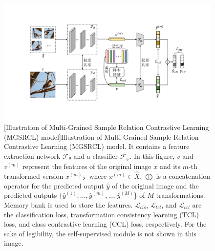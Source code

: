 \begin{figure}[h!]
\centering
{}
\includegraphics[width=1.0\columnwidth]{figures/MGSRCL/model.pdf}
[Illustration of Multi-Grained Sample Relation Contrastive Learning (MGSRCL) model]{Illustration of Multi-Grained Sample Relation Contrastive Learning (MGSRCL) model. It contains a feature extraction network $\mathcal{F}_{\theta}$ and a classifier $\mathcal{F}_{\varphi}$. In this figure, $v$ and $v^{(m)}$ represent the features of the original image $x$ and its $m$-th transformed version $x^{(m)}$，where $x^{(m)} \in \widehat{X}$. $\bigoplus$ is a concatenation operator for the predicted output $\widehat{y}$ of the original image and the predicted outputs $\{\widehat{y}^{(1)}, ..., \widehat{y}^{(m)}, ..., \widehat{y}^{(M)}$\} of $M$ transformations. Memory bank is used to store the features. $\mathcal{L}_{cls}$, $\mathcal{L}_{tcl}$, and $\mathcal{L}_{ccl}$ are the classification loss, transformation consistency learning (TCL) loss, and class contrastive learning (CCL) loss, respectively. For the sake of legibility, the self-supervised module is not shown in this image.}
\label{figure3: model}
\end{figure}


